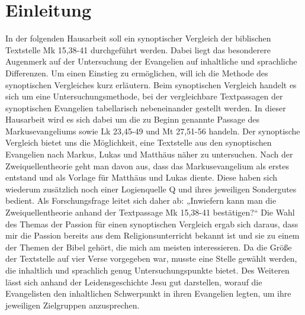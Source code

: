 \section{Einleitung}
In der folgenden Hausarbeit soll ein synoptischer Vergleich der biblischen Textstelle Mk 15,38-41 durchgeführt werden. Dabei liegt das besonderere Augenmerk auf der Untersuchung der Evangelien auf inhaltliche und sprachliche Differenzen. Um einen Einstieg zu ermöglichen, will ich die Methode des synoptischen Vergleiches kurz erläutern.
Beim synoptischen Vergleich handelt es sich um eine Untersuchungsmethode, bei der vergleichbare Textpassagen der synoptischen Evangelien tabellarisch nebeneinander gestellt werden. In dieser Hausarbeit wird es sich dabei um die zu Beginn genannte Passage des Markusevangeliums sowie Lk 23,45-49 und Mt 27,51-56 handeln.
Der synoptische Vergleich bietet uns die Möglichkeit, eine Textstelle aus den synoptischen Evangelien nach Markus, Lukas und Matthäus näher zu untersuchen. Nach der Zweiquellentheorie geht man davon aus, dass das Markusevangelium als erstes entstand und als Vorlage für Matthäus und Lukas diente. Diese haben sich wiederum zusätzlich noch einer Logienquelle Q und ihres jeweiligen Sondergutes bedient.
Als Forschungsfrage leitet sich daher ab: „Inwiefern kann man die Zweiquellentheorie anhand der Textpassage Mk 15,38-41 bestätigen?“
Die Wahl des Themas der Passion für einen synoptischen Vergleich ergab sich daraus, dass mir die Passion bereits aus dem Religionsunterricht bekannt ist  und sie zu einem der Themen der Bibel gehört, die mich am meisten interessieren. Da die Größe der Textstelle auf vier Verse vorgegeben war, musste eine Stelle gewählt werden, die inhaltlich und sprachlich genug Untersuchungspunkte bietet. Des Weiteren lässt sich anhand der Leidensgeschichte Jesu gut darstellen, worauf die Evangelisten den inhaltlichen Schwerpunkt in ihren Evangelien legten, um ihre jeweiligen Zielgruppen anzusprechen. 